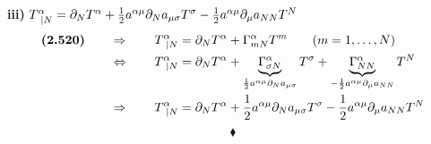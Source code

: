 \textbf{iii)} $T^{\alpha}_{\ |N} = \partial_{N}T^{\alpha}  + \frac{1}{2} a^{\alpha\mu} \partial_N a_{\mu\sigma}T^{\sigma} - \frac{1}{2} a^{\alpha\mu}  \partial_{\mu} a_{NN}T^{N}$\\
\begin{align*}
\textbf{(2.520)}\quad\quad \Rightarrow \quad\quad T^{\alpha}_{\ |N} &= \partial_{N}T^{\alpha}+\Gamma^{\alpha}_{mN}T^m \quad\quad\text{(}m = 1,\dots,N \text{)}\\
\Leftrightarrow \quad\quad T^{\alpha}_{\ |N} &=  \partial_{N}T^{\alpha}+ \underbrace{\Gamma^{\alpha}_{\sigma N }}_{ \frac{1}{2} a^{\alpha \mu}\partial_N a_{\mu\sigma}}  T^{\sigma }+\underbrace{\Gamma^{\alpha}_{N N}}_{ -\frac{1}{2} a^{\alpha\mu}\partial_{\mu} a_{NN}}T^{N}\\
\Rightarrow \quad\quad T^{\alpha}_{\ |N} &=  \partial_{N}T^{\alpha}+ \frac{1}{2} a^{\alpha \mu}\partial_N a_{\mu\sigma}T^{\sigma } -\frac{1}{2} a^{\alpha\mu}\partial_{\mu} a_{NN}T^{N}
\end{align*}
$$\blacklozenge$$
\newpage

